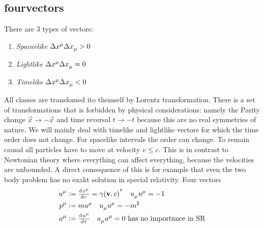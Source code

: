 \subsection{fourvectors}
There are 3 types of vectors:
\begin{enumerate}
\item \emph{Spacaelike} $\Delta\tensor{x}{^\mu}\Delta\tensor{x}{_\mu}>0$
\item \emph{Lightlike} $\Delta\tensor{x}{^\mu}\Delta\tensor{x}{_\mu}=0$
\item \emph{Timelike} $\Delta\tensor{x}{^\mu}\Delta\tensor{x}{_\mu}<0$
\end{enumerate}
All classes are transfomed ito themself by Lorentz transformation. There is a
set of transformations that is forbidden by physical considerations: namely the
Parity change $\vec{x}\to -\vec{x}$ and time reversal $t\to -t$ because this are
no real symmetries of nature.
We will mainly deal with timelike and lightlike vectors for which the time order
does not change. For spacelike intervals the order can change. To remain causal
all particles have to move at velocity $v\leq c$. This is in contrast to
Newtonian theory where everything can affect everything, because the velocities
are unbounded. A direct consequence of this is for example that even the two
body problem has no exakt solution in special relativity.
Four vectors
\begin{align}
\tensor{u}{^\mu}&:=\od{\tensor{x}{^\mu}}{\tau}=\gamma(\vec{v},c)^{\transpose}\quad
\tensor{u}{_\mu}\tensor{u}{^\mu}=-1\\
\tensor{p}{^\mu}&:=m\tensor{u}{^\mu}\quad
\tensor{u}{_\mu}\tensor{u}{^\mu}=-m^2\\
\tensor{a}{^\mu}&:=\od{\tensor{u}{^\mu}}{\tau}\quad
\tensor{a}{_\mu}\tensor{a}{^\mu}=0 \text{ has no importance in SR}
\end{align}

